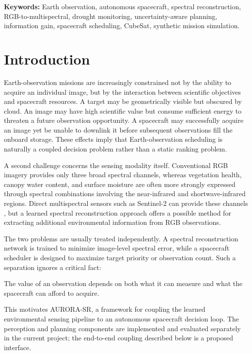 \documentclass[11pt,a4paper]{article}
\newcommand{\AURORASR}{\textsc{AURORA-SR}}
\begin{document}
\noindent
\textbf{Keywords:}
Earth observation,
autonomous spacecraft,
spectral reconstruction,
RGB-to-multispectral,
drought monitoring,
uncertainty-aware planning,
information gain,
spacecraft scheduling,
CubeSat,
synthetic mission simulation.


\section{Introduction}

Earth-observation missions are increasingly constrained not by the
ability to acquire an individual image, but by the interaction between
scientific objectives and spacecraft resources. A target may be
geometrically visible but obscured by cloud. An image may have high
scientific value but consume sufficient energy to threaten a future
observation opportunity. A spacecraft may successfully acquire an image
yet be unable to downlink it before subsequent observations fill the
onboard storage. These effects imply that Earth-observation scheduling
is naturally a coupled decision problem rather than a static ranking
problem.

A second challenge concerns the sensing modality itself. Conventional
RGB imagery provides only three broad spectral channels, whereas
vegetation health, canopy water content, and surface moisture are often
more strongly expressed through spectral combinations involving the
near-infrared and shortwave-infrared regions. Direct multispectral
sensors such as Sentinel-2 can provide these channels
\cite{drusch2012}, but a learned spectral
reconstruction approach offers a possible method for extracting
additional environmental information from RGB observations.

The two problems are usually treated independently. A spectral
reconstruction network is trained to minimize image-level spectral
error, while a spacecraft scheduler is designed to maximize target
priority or observation count. Such a separation ignores a critical
fact:

The value of an observation depends on both what it can measure
and what the spacecraft can afford to acquire.

This motivates \AURORASR{}, a framework for coupling the learned
environmental sensing pipeline to an autonomous spacecraft decision
loop. The perception and planning components are implemented and
evaluated separately in the current project; the end-to-end coupling
described below is a proposed interface.
\end{document}
